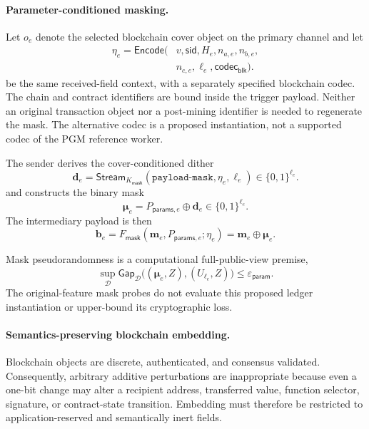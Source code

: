 \documentclass[journal]{IEEEtran}
\theoremstyle{definition}
\theoremstyle{game}
\begin{document}
\paragraph{Parameter-conditioned masking.}
Let $o_e$ denote the selected blockchain cover object on the
primary channel and let
\begin{equation}
\label{eq:blockchain_public_tag}
\begin{aligned}
\eta_e=\mathsf{Encode}\bigl(&v,\mathsf{sid},H_e,n_{a,e},n_{b,e},\\
&n_{c,e},\ell_e,\mathsf{codec}_{\mathsf{blk}}\bigr).
\end{aligned}
\end{equation}
be the same received-field context, with a separately specified blockchain
codec. The chain and contract identifiers are bound inside the trigger
payload. Neither an original transaction object nor a post-mining identifier
is needed to regenerate the mask. The alternative codec is a proposed
instantiation, not a supported codec of the PGM reference worker.

The sender derives the cover-conditioned dither
\begin{equation}
\label{eq:blockchain_dither}
\mathbf d_e=\mathsf{Stream}_{K_{\mathsf{mask}}}(\texttt{payload-mask},\eta_e,\ell_e)\in\{0,1\}^{\ell_e}.
\end{equation}
and constructs the binary mask
\begin{equation}
\label{eq:blockchain_mask_mu}
\boldsymbol\mu_e=P_{\mathsf{params},e}\oplus\mathbf d_e\in\{0,1\}^{\ell_e}.
\end{equation}
The intermediary payload is then
\begin{equation}
\label{eq:blockchain_mask}
\mathbf{b}_e
=
F_{\mathsf{mask}}
\left(
\mathbf{m}_e,
P_{\mathsf{params},e};
\eta_e
\right)
=
\mathbf{m}_e
\oplus
\boldsymbol{\mu}_e.
\end{equation}

Mask pseudorandomness is a computational full-public-view premise,
\begin{equation}\label{eq:blockchain_epsilon_param}
\sup_{\mathcal D}\mathsf{Gap}_{\mathcal D}
\bigl((\boldsymbol\mu_e,Z),(U_{\ell_e},Z)\bigr)
\le\varepsilon_{\mathsf{param}}.
\end{equation}
The original-feature mask probes do not evaluate this proposed
ledger instantiation or upper-bound its cryptographic loss.

\paragraph{Semantics-preserving blockchain embedding.}
Blockchain objects are discrete, authenticated, and consensus
validated. Consequently, arbitrary additive perturbations are
inappropriate because even a one-bit change may alter a recipient
address, transferred value, function selector, signature, or
contract-state transition. Embedding must therefore be restricted
to application-reserved and semantically inert fields.
\end{document}
